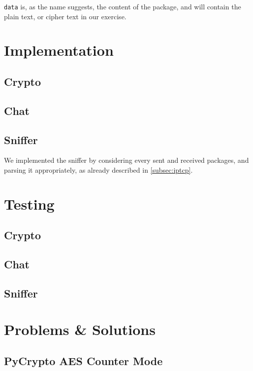 \documentclass[11pt, a4paper]{article}
\begin{document}
\lstinline|data| is, as the name suggests, the content of the package,
and will contain the plain text, or cipher text in our exercise. 

\section{Implementation}

\subsection{Crypto}

\subsection{Chat}

\subsection{Sniffer}

We implemented the sniffer by considering every sent and received
packages, and parsing it appropriately, as already described in
\ref{subsec:iptcp}. 

\section{Testing}

\subsection{Crypto}

\subsection{Chat}

\subsection{Sniffer}



\section{Problems \& Solutions}

\subsection{PyCrypto AES Counter Mode}
\end{document}
